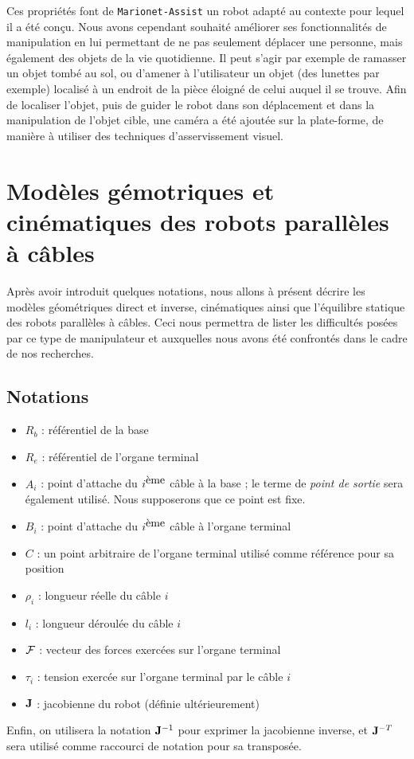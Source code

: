 Ces propriétés font de {\tt Marionet-Assist} un robot adapté au contexte pour 
lequel il a été conçu. Nous avons cependant souhaité améliorer ses 
fonctionnalités de manipulation en lui permettant de ne pas seulement déplacer 
une personne, mais également des objets de la vie quotidienne. Il peut s'agir 
par exemple de ramasser un objet tombé au sol, ou d'amener à l'utilisateur un 
objet (des lunettes par exemple) localisé à un endroit de la pièce éloigné de 
celui auquel il se trouve. Afin de localiser l'objet, puis de guider le robot 
dans son déplacement et dans la manipulation de l'objet cible, une caméra a été 
ajoutée sur la plate-forme, de manière à utiliser des techniques 
d'asservissement visuel.

\section{Mod\`eles g\'emotriques et cin\'ematiques des robots parall\`eles \`a 
c\^ables}

Après avoir introduit quelques notations, nous allons à présent décrire les 
modèles géométriques direct et inverse, cinématiques ainsi que l'équilibre 
statique des robots parallèles à câbles. Ceci nous permettra de lister les difficultés posées par ce type de manipulateur 
et auxquelles nous avons été confrontés dans le cadre de nos recherches.

\subsection{Notations} \label{chap0-1-0}

\begin{figure}[!ht]
\centering
\def\svgwidth{.85\linewidth}

\end{figure}

\begin{itemize}
 \item $R_b$ : référentiel de la base
 \item $R_e$ : référentiel de l'organe terminal
 \item $A_i$ : point d'attache du $i^{\hbox{ème}}$ câble à la base ; le terme 
de {\it point de sortie} sera également utilisé. Nous supposerons que ce point 
est fixe.
 \item $B_i$ : point d'attache du $i^{\hbox{ème}}$ câble à l'organe terminal
 \item $C$ : un point arbitraire de l'organe terminal utilisé comme référence 
pour sa position
 \item $\rho_i$ : longueur réelle du câble $i$
 \item $l_i$ : longueur déroulée du câble $i$
 \item $\boldmath {\mathcal F}$ : vecteur des forces exercées sur l'organe 
terminal
  \item $\tau_i$ : tension exerc\'ee sur l'organe terminal par le c\^able $i$
 \item $\bf J$ : jacobienne du robot (d\'efinie ult\'erieurement)
\end{itemize}
Enfin, on utilisera la notation ${\bf J}^{-1}$ pour exprimer la jacobienne 
inverse, et ${\bf J}^{-T}$ sera utilisé comme raccourci de notation pour sa 
transposée.

